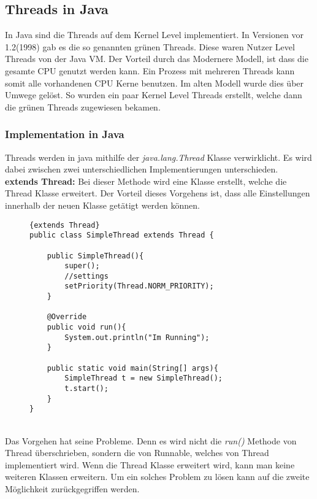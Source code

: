 \subsection{Threads in Java}
In Java sind die Threads auf dem Kernel Level implementiert. In Versionen vor 1.2(1998) gab es die so genannten grünen Threads. Diese waren Nutzer Level Threads von der Java VM. Der Vorteil durch das Modernere Modell, ist dass die gesamte CPU genutzt werden kann. Ein Prozess mit mehreren Threads kann somit alle vorhandenen CPU Kerne benutzen. Im alten Modell wurde dies über Umwege gelöst. So wurden ein paar Kernel Level Threads erstellt, welche dann die grünen Threads zugewiesen bekamen.
\subsubsection{Implementation in Java}
Threads werden in java mithilfe der \textit{java.lang.Thread} Klasse verwirklicht. Es wird dabei zwischen zwei unterschiedlichen Implementierungen unterschieden.\\
\smallskip
\newline
\textbf{extends Thread:} Bei dieser Methode wird eine Klasse erstellt, welche die Thread Klasse erweitert. Der Vorteil dieses Vorgehens ist, dass alle Einstellungen innerhalb der neuen Klasse getätigt werden können.\cite{Java:Thread}
\begin{figure}[h]
\begin{lstlisting}{extends Thread}
public class SimpleThread extends Thread {

    public SimpleThread(){
        super();
        //settings
        setPriority(Thread.NORM_PRIORITY);
    }

    @Override
    public void run(){
        System.out.println("Im Running");
    }

    public static void main(String[] args){
        SimpleThread t = new SimpleThread();
        t.start();
    }
}
\end{lstlisting}
\end{figure}
\\Das Vorgehen hat seine Probleme. Denn es wird nicht die \textit{run()} Methode von Thread überschrieben, sondern die von Runnable, welches von Thread implementiert wird. Wenn die Thread Klasse erweitert wird, kann man keine weiteren Klassen erweitern. Um ein solches Problem zu lösen kann auf die zweite Möglichkeit zurückgegriffen werden.
